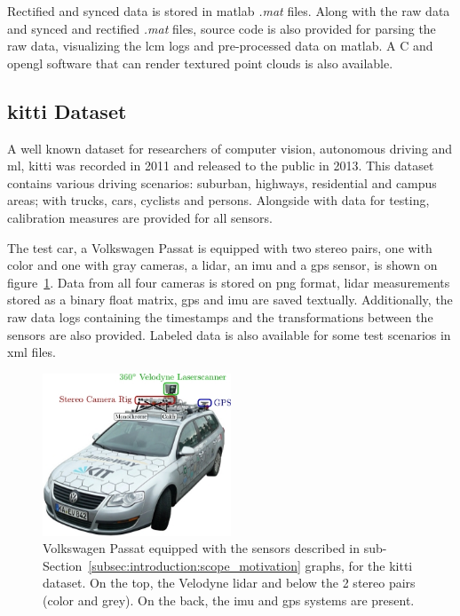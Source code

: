 Rectified and synced data is stored in \ac{matlab} \textit{.mat} files. Along with the raw data and synced and rectified \textit{.mat} files, source code is also provided for parsing the raw data, visualizing the \ac{lcm} logs and pre-processed data on \ac{matlab}. A C and \ac{opengl} software that can render textured point clouds is also available.


\subsection{\acl{kitti} Dataset}
A well known dataset for researchers of computer vision, autonomous driving and \ac{ml}, \ac{kitti} was recorded in 2011 and released to the public in 2013. This dataset contains various driving scenarios: suburban, highways, residential and campus areas; with trucks, cars, cyclists and persons. Alongside with data for testing, calibration measures are provided for all sensors.

The test car, a Volkswagen Passat is equipped with two stereo pairs, one with color and one with gray cameras, a \ac{lidar}, an \ac{imu} and a \ac{gps} sensor, is shown on figure~\ref{fig:sota:kitti_sensors}. Data from all four cameras is stored on \ac{png} format, \ac{lidar} measurements stored as a binary float matrix, \ac{gps} and \ac{imu} are saved textually. Additionally, the raw data logs containing the timestamps and the transformations between the sensors are also provided. Labeled data is also available for some test scenarios in \ac{xml} files.

\begin{figure}[!ht]
	\centering
	\includegraphics[width=0.5\textwidth]{img/sensor_fusion/passat_sensors.jpg}
	\caption{Volkswagen Passat equipped with the sensors described in sub-Section~\ref{subsec:introduction:scope_motivation} graphs, for the \ac{kitti} dataset. On the top, the Velodyne \ac{lidar} and below the 2 stereo pairs (color and grey). On the back, the \ac{imu} and \ac{gps} systems are present.}
	\label{fig:sota:kitti_sensors}
\end{figure}


